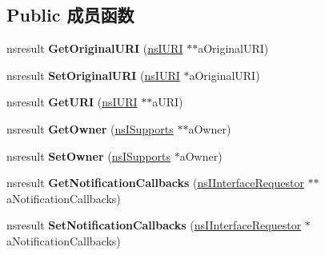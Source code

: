 \subsection*{Public 成员函数}
\begin{DoxyCompactItemize}
\item 
\mbox{\label{interfacens_i_channel_aac37f16949cd6d3d6f7a1ced3f2f7071}} 
nsresult {\bfseries Get\+Original\+U\+RI} (\hyperlink{interfacens_i_u_r_i}{ns\+I\+U\+RI} $\ast$$\ast$a\+Original\+U\+RI)
\item 
\mbox{\label{interfacens_i_channel_a3574b6b37e70f9886b4bcc261318c710}} 
nsresult {\bfseries Set\+Original\+U\+RI} (\hyperlink{interfacens_i_u_r_i}{ns\+I\+U\+RI} $\ast$a\+Original\+U\+RI)
\item 
\mbox{\label{interfacens_i_channel_aa7a1d38d4da4fb7f100a0edbec07806e}} 
nsresult {\bfseries Get\+U\+RI} (\hyperlink{interfacens_i_u_r_i}{ns\+I\+U\+RI} $\ast$$\ast$a\+U\+RI)
\item 
\mbox{\label{interfacens_i_channel_a42ce4f0aa40c44651365d4e7d5341168}} 
nsresult {\bfseries Get\+Owner} (\hyperlink{interfacens_i_supports}{ns\+I\+Supports} $\ast$$\ast$a\+Owner)
\item 
\mbox{\label{interfacens_i_channel_a6534afac8541d1d67843e04c4adf168f}} 
nsresult {\bfseries Set\+Owner} (\hyperlink{interfacens_i_supports}{ns\+I\+Supports} $\ast$a\+Owner)
\item 
\mbox{\label{interfacens_i_channel_a87ba27aeaba23c3f5fb67d4d1e6eb30d}} 
nsresult {\bfseries Get\+Notification\+Callbacks} (\hyperlink{interfacens_i_interface_requestor}{ns\+I\+Interface\+Requestor} $\ast$$\ast$a\+Notification\+Callbacks)
\item 
\mbox{\label{interfacens_i_channel_a18e3c1d012144fe876886d8b8dd71849}} 
nsresult {\bfseries Set\+Notification\+Callbacks} (\hyperlink{interfacens_i_interface_requestor}{ns\+I\+Interface\+Requestor} $\ast$a\+Notification\+Callbacks)
\item 
\mbox{\label{interfacens_i_channel_a679b54365b68e23e7f2e7a77fcd98f68}} 

\end{DoxyCompactItemize}
